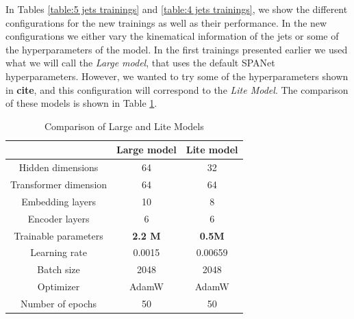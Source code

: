 In Tables \ref{table:5 jets trainings} and  \ref{table:4 jets trainings}, we show the different configurations for the new trainings as well as their performance. In the new configurations we either vary the kinematical information of the jets or some of the hyperparameters of the model. In the first trainings presented earlier we used what we will call the \textit{Large model}, that uses the default SPANet hyperparameters. However, we wanted to try some of the hyperparameters shown in \textbf{cite}, and this configuration will correspond to the \textit{Lite Model}. The comparison of these models is shown in Table \ref{table:comparison_models}.

\begin{table}[h!]
    \centering
     \begin{tabular}{|c||c|c|}
      \hline
         & Large model &  Lite model\\ 
      \hline
      Hidden dimensions & 64 &  32\\ 
      \hline
      Transformer dimension& 64 & 64 \\ 
      \hline
      Embedding layers & 10 & 8 \\ 
      \hline
      Encoder layers & 6 & 6 \\ 
      \hline
      Trainable parameters & \textbf{2.2 M} & \textbf{0.5M} \\ 
      \hline
      Learning rate & 0.0015 & 0.00659 \\ 
      \hline
      Batch size & 2048 & 2048 \\ 
      \hline
      Optimizer & AdamW & AdamW \\ 
      \hline
      Number of epochs & 50 & 50 \\
      \hline
    \end{tabular}
    \caption{Comparison of Large and Lite Models}
    \label{table:comparison_models}
\end{table}


